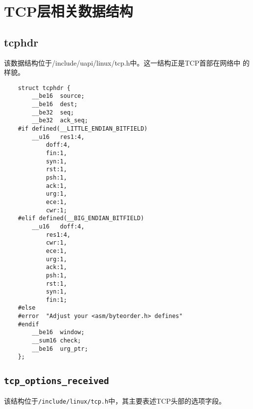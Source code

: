     \section{TCP层相关数据结构}
        \subsection{tcphdr}
            该数据结构位于/include/uapi/linux/tcp.h中。这一结构正是TCP首部在网络中
的样貌。
\begin{verbatim}
    struct tcphdr {
        __be16  source;
        __be16  dest;
        __be32  seq;
        __be32  ack_seq;
    #if defined(__LITTLE_ENDIAN_BITFIELD)
        __u16   res1:4,
            doff:4,
            fin:1,
            syn:1,
            rst:1,
            psh:1,
            ack:1,
            urg:1,
            ece:1,
            cwr:1;
    #elif defined(__BIG_ENDIAN_BITFIELD)
        __u16   doff:4,
            res1:4,
            cwr:1,
            ece:1,
            urg:1,
            ack:1,
            psh:1,
            rst:1,
            syn:1,
            fin:1;
    #else
    #error  "Adjust your <asm/byteorder.h> defines"
    #endif  
        __be16  window;
        __sum16 check;
        __be16  urg_ptr;
    };
\end{verbatim}

        \subsection{\texttt{tcp_options_received}}

        该结构位于\texttt{/include/linux/tcp.h}中，其主要表述TCP头部的选项字段。


